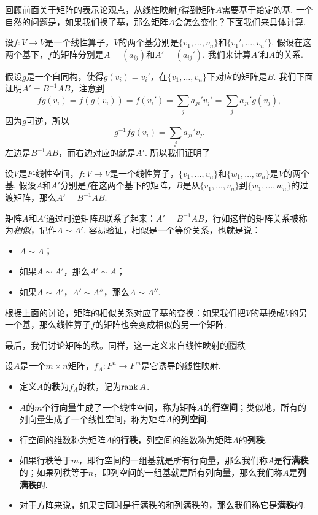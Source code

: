 回顾前面关于矩阵的表示论观点，从线性映射$f$得到矩阵$A$需要基于给定的基. 一个自然的问题是，如果我们换了基，那么矩阵$A$会怎么变化？下面我们来具体计算. 

设$f:V\to V$是一个线性算子，$V$的两个基分别是$\{v_1,\dots,v_n\}$和$\{v_1',\dots,v_n'\}$. 假设在这两个基下，$f$的矩阵分别是$A=(a_{ij})$和$A'=(a_{ij}')$. 我们来计算$A'$和$A$的关系. 

假设$g$是一个自同构，使得$g(v_i)=v_i'$，在$\{v_1,\dots,v_n\}$下对应的矩阵是$B$. 我们下面证明$A'=B^{-1}AB$，注意到
\[fg(v_i)=f(g(v_i))=f(v_i')=\sum_{j}a_{ji}'v_j'=\sum_{j}a_{ji}'g(v_j),\]
因为$g$可逆，所以
\[g^{-1}fg(v_i)=\sum_{j}a_{ji}'v_j.\]
左边是$B^{-1}AB$，而右边对应的就是$A'$. 所以我们证明了

\begin{theorem}\label{thm:base-change}
    设$V$是$F$-线性空间，$f:V\to V$是一个线性算子，$\{v_1,\dots,v_n\}$和$\{w_1,\dots,w_n\}$是$V$的两个基. 假设$A$和$A'$分别是$f$在这两个基下的矩阵，$B$是从$\{v_1,\dots,v_n\}$到$\{w_1,\dots,w_n\}$的过渡矩阵，那么$A'=B^{-1}AB$. 
\end{theorem}

矩阵$A$和$A'$通过可逆矩阵$B$联系了起来：$A'=B^{-1}AB$，行如这样的矩阵关系被称为\emph{相似}，记作$A\sim A'$. 容易验证，相似是一个等价关系，也就是说：
\begin{itemize}
    \item $A\sim A$；
    \item 如果$A\sim A'$，那么$A'\sim A$；
    \item 如果$A\sim A'$，$A'\sim A''$，那么$A\sim A''$.
\end{itemize}

根据上面的讨论，矩阵的相似关系对应了基的变换：如果我们把$V$的基换成$V$的另一个基，那么线性算子$f$的矩阵也会变成相似的另一个矩阵. 

最后，我们讨论矩阵的秩。同样，这一定义来自线性映射的🈯秩

\begin{definition}
设$A$是一个$m\times n$矩阵，$f_A:F^n\to F^m$是它诱导的线性映射.
\begin{itemize}
    \item 定义$A$的\textbf{秩}为$f_A$的秩，记为$\operatorname*{rank} A$.
    \item $A$的$m$个行向量生成了一个线性空间，称为矩阵$A$的\textbf{行空间}；类似地，所有的列向量生成了一个线性空间，称为矩阵$A$的\textbf{列空间}.
    \item 行空间的维数称为矩阵$A$的\textbf{行秩}，列空间的维数称为矩阵$A$的\textbf{列秩}.
    \item 如果行秩等于$m$，即行空间的一组基就是所有行向量，那么我们称$A$是\textbf{行满秩}的；如果列秩等于$n$，即列空间的一组基就是所有列向量，那么我们称$A$是\textbf{列满秩}的.
    \item  对于方阵来说，如果它同时是行满秩的和列满秩的，那么我们称它是\textbf{满秩}的. 
\end{itemize}
\end{definition}

